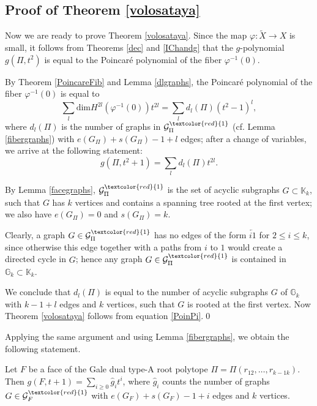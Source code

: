 \subsection{Proof of Theorem \ref{volosataya}}\label{S4.4}

Now we are ready to prove Theorem \ref{volosataya}. Since the map $\varphi: 
\widetilde{X}\to X$ is small, it follows from Theorems \ref{dec}  and 
\ref{IChandg}  that the $g$-polynomial $g(\Pi, t^2)$ is equal to the Poincar\'e 
polynomial of the fiber $\varphi^{-1}(0)$. 

By Theorem \ref{PoincareFib} and Lemma \ref{dlgraphs}, the Poincar\'e 
polynomial of the fiber $\varphi^{-1}(0)$ is equal to 
\begin{equation*} 
\sum_{l} \mathrm{dim}H^{2l}(\varphi^{-1}(0))t^{2l} = \sum_{l} d_l(\Pi)(t^2-1)^{l},
\end{equation*}
where $d_l(\Pi)$ is the number of graphs in 
$\mathcal{G}^{\textcolor{red}{1}}_\Pi$ (cf.  Lemma \ref{fibergraphs}) with 
$e(G_\Pi)+s(G_\Pi)-1+l$ edges; after a change of variables, we arrive at the 
following statement:
\begin{equation}\label{PoinPi}
 g(\Pi, t^2+1) = \sum_{l} d_l(\Pi)t^{2l}.
 \end{equation}

By Lemma \ref{facegraphs}, $\mathcal{G}^{\textcolor{red}{1}}_\Pi$ is the set of acyclic subgraphs $G\subset\mathbb{K}_k$, such that $G$ has $k$ vertices and contains a spanning tree rooted at the first vertex; we also have $e(G_\Pi)=0$ and $s(G_\Pi)=k$.   

Clearly, a graph $G\in \mathcal{G}^{\textcolor{red}{1}}_\Pi$ has no edges of the form $\overleftarrow{i1}$ for $2\leq i \leq k$, since otherwise this edge together with a paths from $i$ to $1$ would create a directed cycle in $G$; hence any graph $G\in \mathcal{G}^{\textcolor{red}{1}}_\Pi$ is contained in $\mathbb{G}_k\subset\mathbb{K}_k$. 


We conclude that $d_l(\Pi)$ is equal to the number of acyclic  subgraphs $G$ of 
$\mathbb{G}_k$ with $k-1+l$ edges and $k$ vertices, such that $G$ is rooted at 
the first vertex. Now Theorem \ref{volosataya} follows from equation 
\eqref{PoinPi}.\qed


Applying the same argument and using Lemma \ref{fibergraphs},  we obtain the following statement. 
\begin{coro}\label{g-polyF} Let $F$ be a face of the Gale dual type-A 
root polytope $\Pi = \Pi(r_{12}, \ldots ,r_{k-1 k})$. Then 
$g(F, t+1) = \sum_{i\geq 0} \hat{g}_it^i$,
where $\hat{g}_i$ counts the number of graphs $G\in \mathcal{G}^{\textcolor{red}{1}}_F$ with $e(G_F)+s(G_F)-1+i$ edges and $k$ vertices.
\end{coro}

